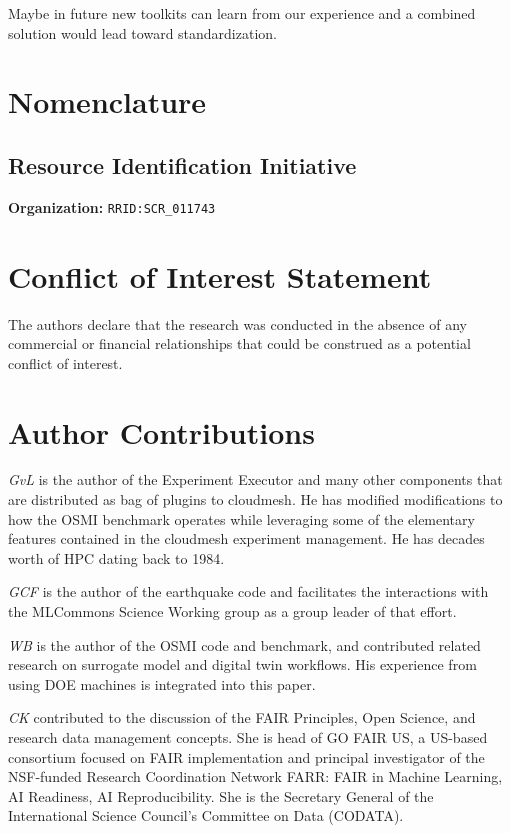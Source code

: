 \documentclass[utf8]{FrontiersinVancouver} %
\begin{document}
Maybe in future new toolkits can learn from our experience and a combined solution would lead toward standardization. 


\clearpage

\section{Nomenclature}

\subsection{Resource Identification Initiative}

{\bf Organization:} \verb|RRID:SCR_011743|

\section*{Conflict of Interest Statement}

The authors declare that the research was conducted in the absence of any commercial or financial relationships that could be construed as a potential conflict of interest.

\section*{Author Contributions}

{\em GvL} is the author of the Experiment Executor and many other components that are distributed as bag of plugins to cloudmesh.  He has modified modifications to how the OSMI benchmark operates while leveraging some of the elementary features contained in the cloudmesh experiment management. He has decades worth of HPC dating back to 1984. 

{\em GCF} is the author of the earthquake code and facilitates the interactions with the MLCommons Science Working group as a group leader of that effort. 


{\em WB} is the author of the OSMI code and benchmark, and contributed related research on surrogate model and digital twin workflows. His experience from using DOE machines is integrated into this paper.

{\em CK} contributed to the discussion of the FAIR Principles, Open Science, and research data management concepts. She is head of GO FAIR US, a US-based consortium focused on FAIR implementation and principal investigator of the NSF-funded Research Coordination Network FARR: FAIR in Machine Learning, AI Readiness, AI Reproducibility. She is the Secretary General of the International Science Council's Committee on Data (CODATA).
\end{document}
